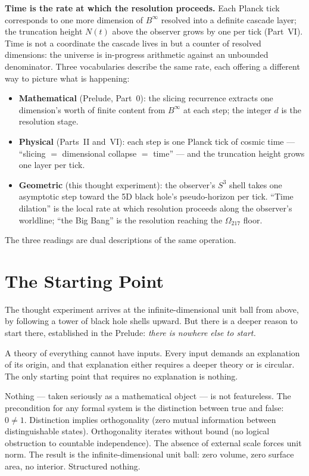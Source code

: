 \documentclass[12pt,a4paper]{article}
\begin{document}
\textbf{Time is the rate at which the resolution proceeds.} Each Planck tick
corresponds to one more dimension of $B^\infty$ resolved into a definite
cascade layer; the truncation height $N(t)$ above the observer grows by one
per tick (Part~VI). Time is not a coordinate the cascade lives in but a
counter of resolved dimensions: the universe is in-progress arithmetic
against an unbounded denominator. Three vocabularies describe the same rate,
each offering a different way to picture what is happening:
\begin{itemize}
\item \textbf{Mathematical} (Prelude, Part~0): the slicing recurrence
extracts one dimension's worth of finite content from $B^\infty$ at each
step; the integer $d$ is the resolution stage.
\item \textbf{Physical} (Parts~II and~VI): each step is one Planck tick of
cosmic time --- ``slicing $=$ dimensional collapse $=$ time'' --- and the
truncation height grows one layer per tick.
\item \textbf{Geometric} (this thought experiment): the observer's $S^3$
shell takes one asymptotic step toward the 5D black hole's pseudo-horizon
per tick. ``Time dilation'' is the local rate at which resolution proceeds
along the observer's worldline; ``the Big Bang'' is the resolution
reaching the $\Omega_{217}$ floor.
\end{itemize}
The three readings are dual descriptions of the same operation.

\section*{The Starting Point}

The thought experiment arrives at the infinite-dimensional unit ball from above,
by following a tower of black hole shells upward. But there is a deeper reason
to start there, established in the Prelude: \emph{there is nowhere else to start.}

A theory of everything cannot have inputs. Every input demands an explanation of
its origin, and that explanation either requires a deeper theory or is circular.
The only starting point that requires no explanation is nothing.

Nothing --- taken seriously as a mathematical object --- is not featureless.
The precondition for any formal system is the distinction between true and false:
$0\neq 1$. Distinction implies orthogonality (zero mutual information between
distinguishable states). Orthogonality iterates without bound (no logical
obstruction to countable independence). The absence of external scale forces unit
norm. The result is the infinite-dimensional unit ball: zero volume, zero
surface area, no interior. Structured nothing.
\end{document}

